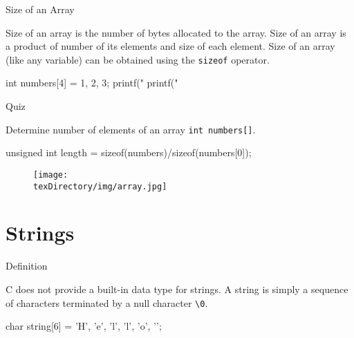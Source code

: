 \documentclass[compress]{beamer}
\begin{document}
\begin{slide}
	\begin{block}{Size of an Array}

	Size of an array is the number of bytes allocated to the array.
	Size of an array is a product of number of its elements and size of each element.
	Size of an array (like any variable) can be obtained using the \alert{\texttt{sizeof}} operator.
	
	\begin{terminal}
	int numbers[4] = {1, 2, 3};
	printf("%
	printf("%
	\end{terminal}

	\end{block}
\end{slide}

\begin{slide}
	\begin{block}{Quiz}

	Determine number of elements of an array \texttt{int numbers[]}.

	\pause

	\begin{terminal}
	unsigned int length = sizeof(numbers)/sizeof(numbers[0]);
	\end{terminal}

	\end{block}
\end{slide}

\begin{slide}
	\begin{figure}
	\texttt{[image: \\texDirectory/img/array.jpg]}
	\end{figure}
\end{slide}

\section{Strings}

\begin{slide}
	\begin{block}{Definition}

	C does not provide a built-in data type for strings.
	A string is simply a sequence of characters terminated by a null character \alert{\texttt{\textbackslash 0}}.

	\begin{terminal}
	char string[6] = {'H', 'e', 'l', 'l', 'o', '\0'};
	\end{terminal}

	\end{block}
\end{slide}
\end{document}
